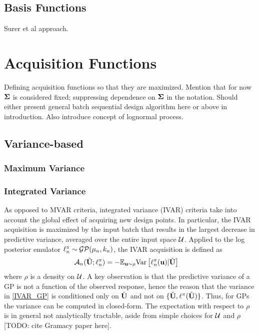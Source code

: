 \documentclass[12pt]{article}
\begin{document}
\subsection{Basis Functions}
Surer et al approach. 

\section{Acquisition Functions}
Defining acquisition functions so that they are maximized. Mention that for now $\CovObs$ is considered fixed; suppressing dependence on 
$\CovObs$ in the notation. Should either present 
general batch sequential design algorithm here or above in introduction. Also introduce concept of lognormal process. 
\subsection{Variance-based}
\subsubsection{Maximum Variance}
\subsubsection{Integrated Variance}
As opposed to MVAR criteria, integrated variance (IVAR) criteria take into account the global effect of acquiring new design points. 
In particular, the IVAR acquisition is maximized by the input batch that results in the largest decrease in predictive variance, averaged 
over the entire input space $\parSpace$. Applied to the log posterior emulator $\logUnPostPred \sim \GP(\logUnPostMeanPred, \logUnPostKerPred)$, 
the IVAR acquisition is defined as 
\begin{align}
\acq[\designIdx](\batchMat; \logUnPostPred) &= -\E_{\bpar \sim \rho} \Var\left[\logUnPostPred(\bpar) | \batchMat \right] \label{IVAR_GP}
\end{align}
where $\rho$ is a density on $\parSpace$. A key observation is that the predictive variance of a GP is not a function of the observed 
response, hence the reason that the variance in \ref{IVAR_GP} is conditioned only on $\batchMat$ and not on 
$\{\batchMat, \logUnPost(\batchMat)\}$. Thus, for GPs the variance can be computed in closed-form. The expectation with respect to 
$\rho$ is in general not 
analytically tractable, aside from simple choices for $\parSpace$ and $\rho$ [TODO: cite Gramacy paper here]. 
\end{document}
